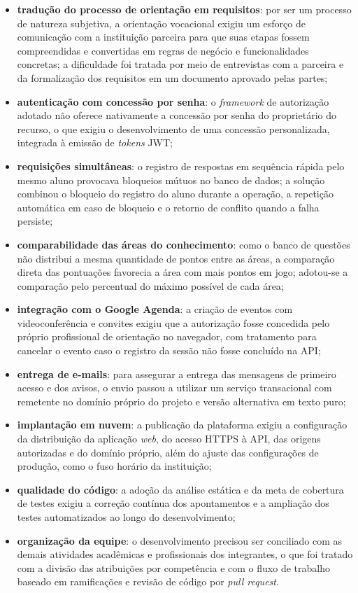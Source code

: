 \begin{itemize}
  \item \textbf{tradução do processo de orientação em requisitos}: por ser um processo de natureza subjetiva, a orientação vocacional exigiu um esforço de comunicação com a instituição parceira para que suas etapas fossem compreendidas e convertidas em regras de negócio e funcionalidades concretas; a dificuldade foi tratada por meio de entrevistas com a parceira e da formalização dos requisitos em um documento aprovado pelas partes;
  \item \textbf{autenticação com concessão por senha}: o \textit{framework} de autorização adotado não oferece nativamente a concessão por senha do proprietário do recurso, o que exigiu o desenvolvimento de uma concessão personalizada, integrada à emissão de \textit{tokens} JWT;
  \item \textbf{requisições simultâneas}: o registro de respostas em sequência rápida pelo mesmo aluno provocava bloqueios mútuos no banco de dados; a solução combinou o bloqueio do registro do aluno durante a operação, a repetição automática em caso de bloqueio e o retorno de conflito quando a falha persiste;
  \item \textbf{comparabilidade das áreas do conhecimento}: como o banco de questões não distribui a mesma quantidade de pontos entre as áreas, a comparação direta das pontuações favorecia a área com mais pontos em jogo; adotou-se a comparação pelo percentual do máximo possível de cada área;
  \item \textbf{integração com o Google Agenda}: a criação de eventos com videoconferência e convites exigiu que a autorização fosse concedida pelo próprio profissional de orientação no navegador, com tratamento para cancelar o evento caso o registro da sessão não fosse concluído na API;
  \item \textbf{entrega de e-mails}: para assegurar a entrega das mensagens de primeiro acesso e dos avisos, o envio passou a utilizar um serviço transacional com remetente no domínio próprio do projeto e versão alternativa em texto puro;
  \item \textbf{implantação em nuvem}: a publicação da plataforma exigiu a configuração da distribuição da aplicação \textit{web}, do acesso HTTPS à API, das origens autorizadas e do domínio próprio, além do ajuste das configurações de produção, como o fuso horário da instituição;
  \item \textbf{qualidade do código}: a adoção da análise estática e da meta de cobertura de testes exigiu a correção contínua dos apontamentos e a ampliação dos testes automatizados ao longo do desenvolvimento;
  \item \textbf{organização da equipe}: o desenvolvimento precisou ser conciliado com as demais atividades acadêmicas e profissionais dos integrantes, o que foi tratado com a divisão das atribuições por competência e com o fluxo de trabalho baseado em ramificações e revisão de código por \textit{pull request}.
\end{itemize}

